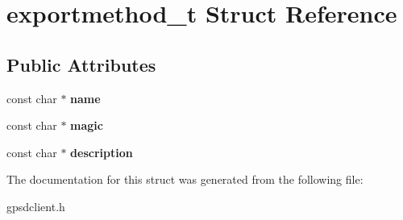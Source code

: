 \hypertarget{structexportmethod__t}{\section{exportmethod\-\_\-t \-Struct \-Reference}
\label{structexportmethod__t}
}
\subsection*{\-Public \-Attributes}
\begin{DoxyCompactItemize}
\item 
\hypertarget{structexportmethod__t_aa036f3ec1ff146b8ea985c6e94fb94cf}{const char $\ast$ {\bfseries name}}\label{structexportmethod__t_aa036f3ec1ff146b8ea985c6e94fb94cf}

\item 
\hypertarget{structexportmethod__t_a9daf4310166f96a96f20625e5e3bd343}{const char $\ast$ {\bfseries magic}}\label{structexportmethod__t_a9daf4310166f96a96f20625e5e3bd343}

\item 
\hypertarget{structexportmethod__t_abd0d35a09834040dbd2816ca9ae03431}{const char $\ast$ {\bfseries description}}\label{structexportmethod__t_abd0d35a09834040dbd2816ca9ae03431}

\end{DoxyCompactItemize}


\-The documentation for this struct was generated from the following file\-:\begin{DoxyCompactItemize}
\item 
gpsdclient.\-h\end{DoxyCompactItemize}
